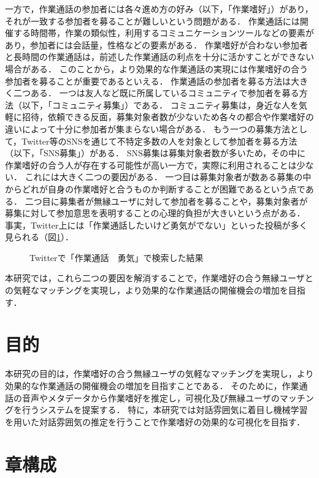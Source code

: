 一方で，作業通話の参加者には各々進め方の好み（以下，「作業嗜好」）があり，それが一致する参加者を募ることが難しいという問題がある．
作業通話には開催する時間帯，作業の類似性，利用するコミュニケーションツールなどの要素があり，参加者には会話量，性格などの要素がある．
作業嗜好が合わない参加者と長時間の作業通話は，前述した作業通話の利点を十分に活かすことができない場合がある．
このことから，より効果的な作業通話の実現には作業嗜好の合う参加者を募ることが重要であるといえる．
作業通話の参加者を募る方法は大きく二つある．
一つは友人など既に所属しているコミュニティで参加者を募る方法（以下，「コミュニティ募集」）である．
コミュニティ募集は，身近な人を気軽に招待，依頼できる反面，募集対象者数が少ないため各々の都合や作業嗜好の違いによって十分に参加者が集まらない場合がある．
もう一つの募集方法として，Twitter\cite{Twitter}等のSNSを通じて不特定多数の人を対象として参加者を募る方法（以下，「SNS募集」）がある．
SNS募集は募集対象者数が多いため，その中に作業嗜好の合う人が存在する可能性が高い一方で，実際に利用されることは少ない．
これには大きく二つの要因がある．
一つ目は募集対象者が数ある募集の中からどれが自身の作業嗜好と合うものか判断することが困難であるという点である．
二つ目に募集者が無縁ユーザに対して参加者を募ることや，募集対象者が募集に対して参加意思を表明することの心理的負担が大きいという点がある．
事実，Twitter上には「作業通話したいけど勇気がでない」といった投稿が多く見られる（図\ref{fig:search_results}）．

\begin{figure}
    \centering
    \caption{Twitterで「作業通話　勇気」で検索した結果}
    \label{fig:search_results}
\end{figure}

本研究では，これら二つの要因を解消することで，作業嗜好の合う無縁ユーザとの気軽なマッチングを実現し，より効果的な作業通話の開催機会の増加を目指す．

\section{目的}

本研究の目的は，作業嗜好の合う無縁ユーザの気軽なマッチングを実現し，より効果的な作業通話の開催機会の増加を目指すことである．
そのために，作業通話の音声やメタデータから作業嗜好を推定し，可視化及び無縁ユーザのマッチングを行うシステムを提案する．
特に，本研究では対話雰囲気に着目し機械学習を用いた対話雰囲気の推定を行うことで作業嗜好の効果的な可視化を目指す．

\section{章構成}

